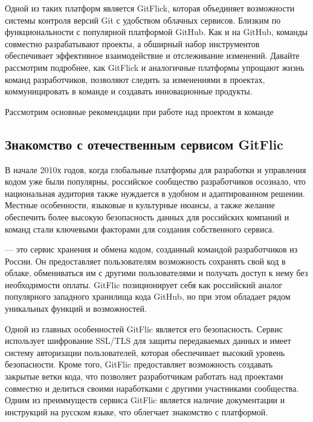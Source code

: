\documentclass[letterpaper,10pt,russian]{sphinxmanual}
\begin{document}
\sphinxAtStartPar
Одной из таких платформ является GitFlick, которая объединяет возможности системы контроля версий Git с удобством облачных сервисов. Близким по функциональности с популярной платформой GitHub. Как и на GitHub, команды совместно разрабатывают проекты, а обширный набор инструментов обеспечивает эффективное взаимодействие и отслеживание изменений. Давайте рассмотрим подробнее, как GitFlick и аналогичные платформы упрощают жизнь команд разработчиков, позволяют следить за изменениями в проектах, коммуницировать в команде и создавать инновационные продукты.

\sphinxAtStartPar
Рассмотрим основные рекомендации при работе над проектом в команде


\subsection{Знакомство с отечественным сервисом GitFlic}
\label{\detokenize{educational_materials/team_work_on_a_gitflic/content:gitflic}}
\sphinxAtStartPar
{}

\sphinxAtStartPar
В начале 2010\sphinxhyphen{}х годов, когда глобальные платформы для разработки и управления кодом уже были популярны, российское сообщество разработчиков осознало, что национальная аудитория также нуждается в удобном и адаптированном решении. Местные особенности, языковые и культурные нюансы, а также желание обеспечить более высокую безопасность данных для российских компаний и команд стали ключевыми факторами для создания собственного сервиса.

\sphinxAtStartPar
{} — это сервис хранения и обмена кодом, созданный командой разработчиков из России. Он предоставляет пользователям возможность сохранять свой код в облаке, обмениваться им с другими пользователями и получать доступ к нему без необходимости оплаты. GitFlic позиционирует себя как российский аналог популярного западного хранилища кода GitHub, но при этом обладает рядом уникальных функций и возможностей.

\sphinxAtStartPar
Одной из главных особенностей GitFlic является его безопасность. Сервис использует шифрование SSL/TLS для защиты передаваемых данных и имеет систему авторизации пользователей, которая обеспечивает высокий уровень безопасности. Кроме того, GitFlic предоставляет возможность создавать закрытые ветки кода, что позволяет разработчикам работать над проектами совместно и делиться своими наработками с другими участниками сообщества. Одним из преиммуществ сервиса GitFlic является наличие документации и инструкций на русском языке, что облегчает знакомство с платформой.
\end{document}
